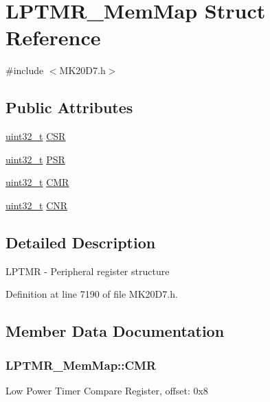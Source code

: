 \hypertarget{struct_l_p_t_m_r___mem_map}{}\section{L\+P\+T\+M\+R\+\_\+\+Mem\+Map Struct Reference}
\label{struct_l_p_t_m_r___mem_map}


{\ttfamily \#include $<$M\+K20\+D7.\+h$>$}

\subsection*{Public Attributes}
\begin{DoxyCompactItemize}
\item 
\hyperlink{_p_e___types_8h_a33594304e786b158f3fb30289278f5af}{uint32\+\_\+t} \hyperlink{struct_l_p_t_m_r___mem_map_a4dcb593756f09d67e3d064d95e3f2d68}{C\+SR}
\item 
\hyperlink{_p_e___types_8h_a33594304e786b158f3fb30289278f5af}{uint32\+\_\+t} \hyperlink{struct_l_p_t_m_r___mem_map_a05f0c5c90722e5a1757c262c818d2462}{P\+SR}
\item 
\hyperlink{_p_e___types_8h_a33594304e786b158f3fb30289278f5af}{uint32\+\_\+t} \hyperlink{struct_l_p_t_m_r___mem_map_a28ac745e518d40e34527f5cf70f75d70}{C\+MR}
\item 
\hyperlink{_p_e___types_8h_a33594304e786b158f3fb30289278f5af}{uint32\+\_\+t} \hyperlink{struct_l_p_t_m_r___mem_map_adda036ea26ea5cc89d7957779c5680f0}{C\+NR}
\end{DoxyCompactItemize}


\subsection{Detailed Description}
L\+P\+T\+MR -\/ Peripheral register structure 

Definition at line 7190 of file M\+K20\+D7.\+h.



\subsection{Member Data Documentation}
\subsubsection[{\texorpdfstring{C\+MR}{CMR}}]{ L\+P\+T\+M\+R\+\_\+\+Mem\+Map\+::\+C\+MR}\hypertarget{struct_l_p_t_m_r___mem_map_a28ac745e518d40e34527f5cf70f75d70}{}\label{struct_l_p_t_m_r___mem_map_a28ac745e518d40e34527f5cf70f75d70}
Low Power Timer Compare Register, offset\+: 0x8 

